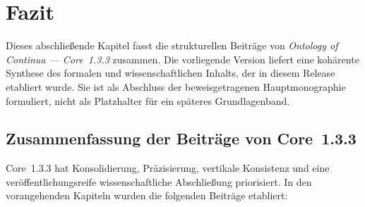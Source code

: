 
\section{Fazit}
\label{sec:conclusion}

Dieses abschließende Kapitel fasst die strukturellen Beiträge von
\emph{Ontology of Continua --- Core~1.3.3} zusammen.
Die vorliegende Version liefert eine kohärente Synthese des formalen und
wissenschaftlichen Inhalts, der in diesem Release etabliert wurde.
Sie ist als Abschluss der beweisgetragenen Hauptmonographie formuliert,
nicht als Platzhalter für ein späteres Grundlagenband.

\subsection{Zusammenfassung der Beiträge von Core~1.3.3}

Core~1.3.3 hat Konsolidierung, Präzisierung, vertikale Konsistenz und eine
veröffentlichungsreife wissenschaftliche Abschließung priorisiert.
In den vorangehenden Kapiteln wurden die folgenden Beiträge etabliert:

